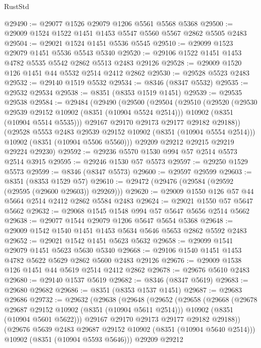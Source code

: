 \begin{lexlean}{RustStd}
\begin{coremodule}
@29490 := @29077 @1526 @29079 @1206 @5561 @5568 @5368
@29500 := @29009 @1524 @1522 @1451 @1453 @5547 @5560 @5567 @2862 @5505 @2483
@29504 := @29021 @1524 @1451 @5536 @5545
@29510 := @29099 @1523 @29079 @1451 @5536 @5543 @5340
@29520 := @29106 @1522 @1451 @1453 @4782 @5535 @5542 @2862 @5513 @2483 @29126
@29528 := @29009 @1520 @126 @1451 @44 @5532 @2514 @2412 @2862
@29530 := @29528 @5523 @2483
@29532 := @29140 @1519 @5532
@29534 := @8346 (@8347 @5532)
@29535 := @29532 @29534
@29538 := @8351 (@8353 @1519 @1451)
@29539 := @29535 @29538
@29584 := @29484
    (@29490
      (@29500
        (@29504
          (@29510
            (@29520
              (@29530 @29539 @29152 @10902 (@8351 (@10904 @5524 @2514)))
              @10902
              (@8351 (@10904 @5514 @5535)))
            @29167
            @29170
            @29173
            @29177
            @29182
            @29188))
        (@29528 @5553 @2483 @29539 @29152 @10902 (@8351 (@10904 @5554 @2514)))
        @10902
        (@8351 (@10904 @5506 @5560)))
      @29209
      @29212
      @29215
      @29219
      @29224
      @29230)
@29592 := @29236 @5570 @1530 @994 @57 @2514 @5573 @2514 @3915
@29595 := @29246 @1530 @57 @5573
@29597 := @29250 @1529 @5573
@29599 := @8346 (@8347 @5573)
@29600 := @29597 @29599
@29603 := @8351 (@8353 @1529 @57)
@29610 := @29472 (@29476 (@29584 (@29592 (@29595 (@29600 @29603)) @29269)))
@29620 := @29009 @1550 @126 @57 @44 @5664 @2514 @2412 @2862 @5584 @2483
@29624 := @29021 @1550 @57 @5647 @5662
@29632 := @29068 @1545 @1548 @994 @57 @5647 @5656 @2514 @5662
@29638 := @29077 @1544 @29079 @1206 @5647 @5654 @5368
@29648 := @29009 @1542 @1540 @1451 @1453 @5634 @5646 @5653 @2862 @5592 @2483
@29652 := @29021 @1542 @1451 @5623 @5632
@29658 := @29099 @1541 @29079 @1451 @5623 @5630 @5340
@29668 := @29106 @1540 @1451 @1453 @4782 @5622 @5629 @2862 @5600 @2483 @29126
@29676 := @29009 @1538 @126 @1451 @44 @5619 @2514 @2412 @2862
@29678 := @29676 @5610 @2483
@29680 := @29140 @1537 @5619
@29682 := @8346 (@8347 @5619)
@29683 := @29680 @29682
@29686 := @8351 (@8353 @1537 @1451)
@29687 := @29683 @29686
@29732 := @29632
    (@29638
      (@29648
        (@29652
          (@29658
            (@29668
              (@29678 @29687 @29152 @10902 (@8351 (@10904 @5611 @2514)))
              @10902
              (@8351 (@10904 @5601 @5622)))
            @29167
            @29170
            @29173
            @29177
            @29182
            @29188))
        (@29676 @5639 @2483 @29687 @29152 @10902 (@8351 (@10904 @5640 @2514)))
        @10902
        (@8351 (@10904 @5593 @5646)))
      @29209
      @29212

\end{coremodule}
\end{lexlean}

